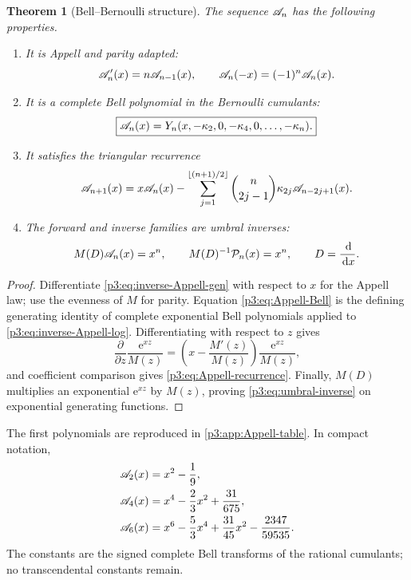 \documentclass[11pt,oneside]{article}
\numberwithin{equation}{section}
\newtheorem{theorem}{Theorem}[section]
\theoremstyle{definition}
\theoremstyle{remark}
\newcommand{\e}{\mathrm e}
\newcommand{\dd}{\,\mathrm d}
\begin{document}
\begin{theorem}[Bell--Bernoulli structure]
\label{p3:thm:Appell-Bell}
The sequence $\mathscr A_n$ has the following properties.
\begin{enumerate}
\item It is Appell and parity adapted:
\begin{equation}
 \mathscr A_n'(x)=n\mathscr A_{n-1}(x),
 \qquad
 \mathscr A_n(-x)=(-1)^n\mathscr A_n(x).
 \label{p3:eq:Appell-basic}
\end{equation}
\item It is a complete Bell polynomial in the Bernoulli cumulants:
\begin{equation}
 \boxed{\displaystyle
 \mathscr A_n(x)=Y_n(x,-\kappa_2,0,-\kappa_4,0,\ldots,-\kappa_n).}
 \label{p3:eq:Appell-Bell}
\end{equation}
\item It satisfies the triangular recurrence
\begin{equation}
 \mathscr A_{n+1}(x)
 =x\mathscr A_n(x)
 -\sum_{j=1}^{\left\lfloor(n+1)/2\right\rfloor}
 \binom n{2j-1}\kappa_{2j}\mathscr A_{n-2j+1}(x).
 \label{p3:eq:Appell-recurrence}
\end{equation}
\item The forward and inverse families are umbral inverses:
\begin{equation}
 M(D)\Acal_n(x)=x^n,
 \qquad
 M(D)^{-1}\Pcal_n(x)=x^n,
 \qquad D=\frac{\dd}{\dd x}.
 \label{p3:eq:umbral-inverse}
\end{equation}
\end{enumerate}
\end{theorem}

\begin{proof}
Differentiate \eqref{p3:eq:inverse-Appell-gen} with respect to $x$ for the Appell law; use the evenness of $M$ for parity.  Equation \eqref{p3:eq:Appell-Bell} is the defining generating identity of complete exponential Bell polynomials applied to \eqref{p3:eq:inverse-Appell-log}.  Differentiating with respect to $z$ gives
\[
 \frac{\partial}{\partial z}\frac{\e^{xz}}{M(z)}
 =\left(x-\frac{M'(z)}{M(z)}\right)\frac{\e^{xz}}{M(z)},
\]
and coefficient comparison gives \eqref{p3:eq:Appell-recurrence}.  Finally, $M(D)$ multiplies an exponential $\e^{xz}$ by $M(z)$, proving \eqref{p3:eq:umbral-inverse} on exponential generating functions.
\end{proof}

The first polynomials are reproduced in \cref{p3:app:Appell-table}.  In compact notation,
\begin{align*}
 \mathscr A_2(x)&=x^2-\frac19,\\
 \mathscr A_4(x)&=x^4-\frac23x^2+\frac{31}{675},\\
 \mathscr A_6(x)&=x^6-\frac53x^4+\frac{31}{45}x^2-\frac{2347}{59535}.
\end{align*}
The constants are the signed complete Bell transforms of the rational cumulants; no transcendental constants remain.
\end{document}

